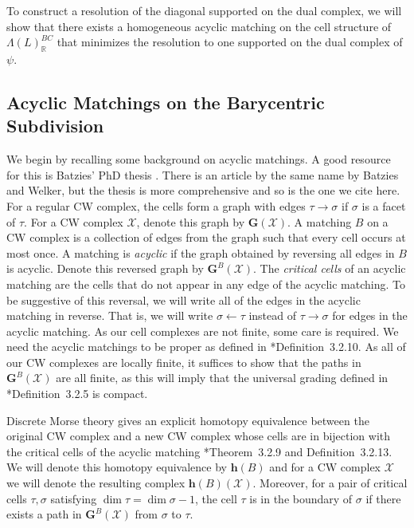 \documentclass{amsart}
\newcommand{\RR}{\mathbb{R}}
\newcommand{\homotopy}{\mathbf{h}}
\newcommand{\graph}{\mathbf{G}}
\theoremstyle{remark}
\begin{document}
To construct a resolution of the diagonal supported on the dual complex, we will show that there exists a homogeneous acyclic matching on the cell structure of $\Lambda(L)_{\RR}^{BC}$ that minimizes the resolution to one supported on the dual complex of $\psi$.

\subsection*{Acyclic Matchings on the Barycentric Subdivision}


We begin by recalling some background on acyclic matchings. A good resource for this is Batzies' PhD thesis \cite{Batzies}. There is an article by the same name by Batzies and Welker, but the thesis is more comprehensive and so is the one we cite here.
For a regular CW complex, the cells form a graph with edges $\tau \rightarrow \sigma$ if $\sigma$ is a facet of $\tau$. For a CW complex $\mathcal{X}$, denote this graph by $\graph(\mathcal{X})$. A matching $B$ on a CW complex is a collection of edges from the graph such that every cell occurs at most once. A matching is \emph{acyclic} if the graph obtained by reversing all edges in $B$ is acyclic. Denote this reversed graph by $\graph^{B}(\mathcal{X})$. The \emph{critical cells} of an acyclic matching are the cells that do not appear in any edge of the acyclic matching. To be suggestive of this reversal, we will write all of the edges in the acyclic matching in reverse. That is, we will write $\sigma \leftarrow \tau$ instead of $\tau\rightarrow \sigma$ for edges in the acyclic matching. As our cell complexes are not finite, some care is required. We need the acyclic matchings to be proper as defined in \cite{Batzies}*{Definition~3.2.10}. As all of our CW complexes are locally finite, it suffices to show that the paths in $\graph^{B}(\mathcal{X})$ are all finite, as this will imply that the universal grading defined in \cite{Batzies}*{Definition~3.2.5} is compact.

Discrete Morse theory gives an explicit homotopy equivalence between the original CW complex and a new CW complex whose cells are in bijection with the critical cells of the acyclic matching \cite{Batzies}*{Theorem~3.2.9 and Definition~3.2.13}.
We will denote this homotopy equivalence by $\homotopy(B)$ and for a CW complex $\mathcal{X}$ we will denote the resulting complex $\homotopy(B)(\mathcal{X})$.
Moreover, for a pair of critical cells $\tau,\sigma$ satisfying $\dim \tau = \dim \sigma - 1$, the cell $\tau$ is in the boundary of $\sigma$ if there exists a path in $\graph^{B}(\mathcal{X})$ from $\sigma$ to $\tau$.
\end{document}
